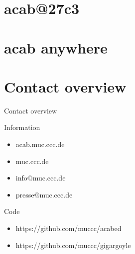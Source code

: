 \documentclass{beamer}
\begin{document}
\section{acab@27c3}

\section{acab anywhere}
\section{Contact overview}
\begin{frame}{Contact overview}
  \begin{block}{Information}
    \begin{itemize}
    \item acab.muc.ccc.de
    \item muc.ccc.de
    \item info@muc.ccc.de
    \item presse@muc.ccc.de
    \end{itemize}
  \end{block}
  \begin{block}{Code}
    \begin{itemize}
    \item https://github.com/muccc/acabed
    \item https://github.com/muccc/gigargoyle
    \end{itemize}
  \end{block}
\end{frame}
\end{document}
